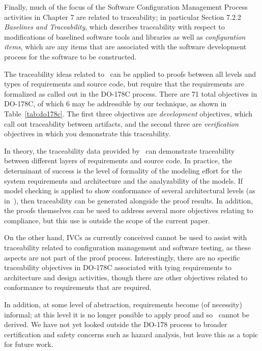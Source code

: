 Finally, much of the focus of the Software Configuration Management Process activities in Chapter 7 are related to traceability; in particular Section 7.2.2 {\em Baselines and Traceability}, which describes traceability with respect to modifications of baselined software tools and libraries as well as {\em configuration items}, which are any items that are associated with the software development process for the software to be constructed.

The traceability ideas related to \mivcs\ can be applied to proofs between all levels and types of requirements and source code, but require that the requirements are formalized as called out in the DO-178C process.  There are 71 total objectives in DO-178C, of which 6 may be addressible by our technique, as shown in Table~\ref{tab:do178c}.  The first three objectives are {\em development} objectives, which call out traceability between artifacts, and the second three are {\em verification} objectives in which you demonstrate this traceability.

In theory, the traceability data provided by \mivcs\ can demonstrate traceability between different layers of requirements and source code.  In practice, the determinant of success is the level of formality of the modeling effort for the system requirements and architecture and the analyzability of the models.  If model checking is applied to show conformance of several architectural levels (as in~\cite{QFCS15:backes,hilt2013}), then traceability can be generated alongside the proof results.   In addition, the proofs themselves can be used to address several more objectives relating to compliance, but this use is outside the scope of the current paper.

On the other hand, IVCs as currently conceived cannot be used to assist with traceability related to configuration management and software testing, as these aspects are not part of the proof process.  Interestingly, there are no specific traceability objectives in DO-178C associated with tying requirements to architecture and design activities, though there are other objectives related to conformance to requirements that are required.

In addition, at some level of abstraction, requirements become (of necessity) informal; at this level it is no longer possible to apply proof and so \mivcs\ cannot be derived.  We have not yet looked outside the DO-178 process to broader certification and safety concerns such as hazard analysis, but leave this as a topic for future work.

